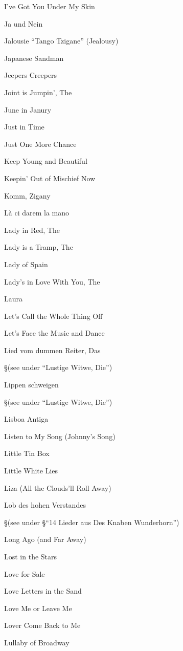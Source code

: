 \N I've Got You Under My Skin


\N Ja und Nein


\N Jalousie ``Tango Tzigane'' (Jealousy)


\N Japanese Sandman


\N Jeepers Creepers


\N Joint is Jumpin', The


\N June in Janury


\N Just in Time


\N Just One More Chance


\N Keep Young and Beautiful


\N Keepin' Out of Mischief Now


\N Komm, Zigany


\N L{\`a} ci darem la mano


\N Lady in Red, The


\N Lady is a Tramp, The


\N Lady of Spain


\N Lady's in Love With You, The


\N Laura


\N Let's Call the Whole Thing Off


\N Let's Face the Music and Dance


\N Lied vom dummen Reiter, Das

\nobreak
\S (see under ``Lustige Witwe, Die'')

\N Lippen schweigen

\nobreak
\S (see under ``Lustige Witwe, Die'')

\N Lisboa Antiga


\N Listen to My Song (Johnny's Song)


\N Little Tin Box


\N Little White Lies


\N Liza (All the Clouds'll Roll Away)


\N Lob des hohen Verstandes

\nobreak
\S (see under
\S ``14 Lieder aus Des Knaben Wunderhorn'')

\N Long Ago (and Far Away)


\N Lost in the Stars


\N Love for Sale


\N Love Letters in the Sand


\N Love Me or Leave Me


\N Lover Come Back to Me


\N Lullaby of Broadway


